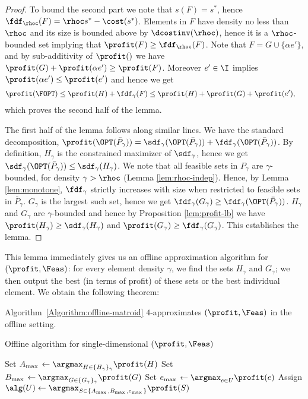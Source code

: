 \begin{proof}
To bound the second part we note that $s(F) = s^*$, hence
$\fdf_\rhoc(F) = \rhoc s^* - \cost(s^*)$. Elements in $F$ have density
no less than $\rhoc$ and its size is bounded above by
$\dcostinv(\rhoc)$, hence it is a $\rhoc$-bounded set implying that
$\profit(F) \geq \fdf_\rhoc(F) $.  Note that $F = G \cup \{ \alpha e'
\}$, and by sub-additivity of $\profit()$ we have $\profit(G) +
\profit(\alpha e' ) \geq \profit(F) $. Moreover $e' \in \I$ implies
$\profit(\alpha e' ) \leq \profit(e')$ and hence we get
\begin{align*}
\profit(\FOPT) & \leq \profit(H) + \fdf_\gamma(F) \leq \profit(H) + \profit(G) + \profit(e'),
\end{align*}
which proves the second half of the lemma.

The first half of the lemma follows along similar lines. We 
have the standard decomposition, $\profit(\OPT( \bar{P}_\gamma) ) =
\sdf_\gamma(\OPT(\bar{P}_\gamma)) + \fdf_\gamma(\OPT(
\bar{P}_\gamma))$. By definition, $H_\gamma$ is the
constrained maximizer of $\sdf_\gamma$, hence we get  
$\sdf_\gamma(\OPT( \bar{P}_\gamma) ) \leq \sdf_\gamma(H_\gamma)$. We 
note that all feasible sets in $P_\gamma$ are $\gamma$-bounded, 
for density $\gamma > \rhoc$ (Lemma \ref{lem:rhoc-indep}). Hence, by Lemma \ref{lem:monotone}, $\fdf_\gamma$ strictly increases with size when restricted to feasible sets in $\bar{P}_\gamma$. $G_\gamma$ is the largest such set, hence we get $\fdf_\gamma(G_\gamma) \geq \fdf_\gamma(\OPT(\bar{P}_\gamma))$. $H_\gamma$ and $G_\gamma$ are $\gamma$-bounded and hence by Proposition \ref{lem:profit-lb} we have $\profit(H_\gamma) \geq \sdf_\gamma(H_\gamma)$ and
$\profit(G_\gamma) \geq \fdf_\gamma(G_\gamma)$. This establishes the lemma.
\end{proof}

This lemma immediately gives us an offline approximation algorithm for
$(\profit,\Feas)$: for every element density $\gamma$, we find the
sets $H_{\gamma}$ and $G_{\gamma}$; we then output the best (in terms of profit) of these sets or the best individual element. We obtain the following theorem:

\begin{theorem}
\label{theorem:matroid_offline}
Algorithm~\ref{Algorithm:offline-matroid} $4$-approximates
$(\profit,\Feas)$ in the offline setting.  
\end{theorem}


\begin{algorithm}
  \caption{Offline algorithm for single-dimensional $(\profit, \Feas)$}
\label{Algorithm:offline-matroid}
\begin{algorithmic}[1]
\STATE Set $A_{\max{}} \leftarrow \argmax_{H \in \{ H_\gamma\}_\gamma } \profit(H)$
\STATE Set $B_{\max{}} \leftarrow \argmax_{ G \in \{G_\gamma \}_\gamma } \profit(G)$ 
\STATE Set $ e_{\max{}} \leftarrow \argmax_{e \in
  U} \profit(e) $ 
\STATE Assign $\alg(U) \leftarrow \argmax_{ S \in \{ A_{\max{}}, B_{\max{}}, e_{\max{}} \}} \profit(S)$
\end{algorithmic}
\end{algorithm}


